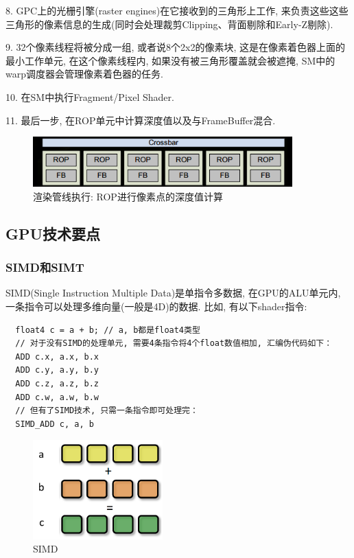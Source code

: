 \documentclass[UTF8]{ctexart}
\begin{document}
8. GPC上的光栅引擎(raster engines)在它接收到的三角形上工作, 来负责这些这些三角形的像素信息的生成(同时会处理裁剪Clipping、背面剔除和Early-Z剔除). 

9. 32个像素线程将被分成一组, 或者说8个2x2的像素块, 这是在像素着色器上面的最小工作单元, 在这个像素线程内, 如果没有被三角形覆盖就会被遮掩, SM中的warp调度器会管理像素着色器的任务. 

10. 在SM中执行Fragment/Pixel Shader.

11. 最后一步, 在ROP单元中计算深度值以及与FrameBuffer混合.

\begin{figure}[H]
  \includegraphics[width=10cm]{rendering_logic_5.png}
  \centering
  \caption{渲染管线执行: ROP进行像素点的深度值计算}
  \label{fig:rendering_pipeline_depth}
\end{figure}

\subsection{GPU技术要点}

\subsubsection{SIMD和SIMT}
SIMD(Single Instruction Multiple Data)是单指令多数据, 在GPU的ALU单元内, 一条指令可以处理多维向量(一般是4D)的数据. 比如, 有以下shader指令:
\begin{verbatim}
  float4 c = a + b; // a, b都是float4类型
  // 对于没有SIMD的处理单元, 需要4条指令将4个float数值相加, 汇编伪代码如下：
  ADD c.x, a.x, b.x
  ADD c.y, a.y, b.y
  ADD c.z, a.z, b.z
  ADD c.w, a.w, b.w
  // 但有了SIMD技术, 只需一条指令即可处理完：
  SIMD_ADD c, a, b
\end{verbatim}

\begin{figure}[H]
  \includegraphics[width=5cm]{simd.png}
  \centering
  \caption{SIMD}
  \label{fig:simd}
\end{figure}
\end{document}
